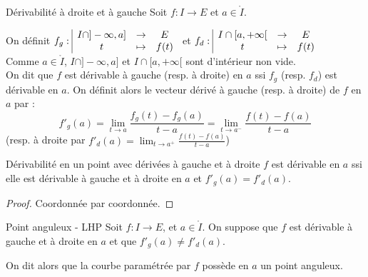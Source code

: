 \begin{definition}{Dérivabilité à droite et à gauche}{}
    Soit $f : I \to E$ et $a \in \mathring I$. 

    \avspace On définit $f_g: \space \begin{array}{|ccc} \displaystyle I \cap ]-\infty, a] & \to & \displaystyle E \\ \displaystyle t & \mapsto & \displaystyle f(t) \end{array}$ et
    $f_d: \space \begin{array}{|ccc} \displaystyle I \cap [a, +\infty[ & \to & \displaystyle E \\ \displaystyle t & \mapsto & \displaystyle f(t) \end{array}$ \\

    Comme $a \in \mathring I$, $I \cap ]-\infty, a]$ et $I \cap [a, +\infty[$ 
    sont d'intérieur non vide. \\

    On dit que $f$ est dérivable à gauche (resp. à droite) en $a$ ssi $f_g$ 
    (resp. $f_d$) est dérivable en $a$.
    On définit alors le vecteur dérivé à gauche (resp. à droite) de $f$ en $a$ par :
    \[f'_g(a) = \lim_{t \to a} \frac{f_g(t) - f_g(a)}{t-a} = \lim_{t \to a^-} \frac{f(t) - f(a)}{t-a}\]
    (resp. à droite par $f'_d(a) = \lim_{t \to a^+} \frac{f(t) - f(a)}{t-a}$)                                                    
\end{definition}

\begin{proposition}{Dérivabilité en un point avec dérivées à gauche et à droite}{}
    $f$ est dérivable en $a$ ssi elle est dérivable à gauche et à droite en $a$ et
    $f'_g(a) = f'_d(a)$. 
\end{proposition}

\begin{proof}
    Coordonnée par coordonnée.
\end{proof}

\begin{definition}{Point anguleux - LHP}{}
    Soit $f : I \to E$, et $a \in \mathring{I}$. 
    On suppose que $f$ est dérivable à gauche et à droite en $a$ et que 
    $f'_g(a) \neq f'_d(a)$.

    On dit alors que la courbe paramétrée par $f$ possède en $a$ un point anguleux.
\end{definition}


